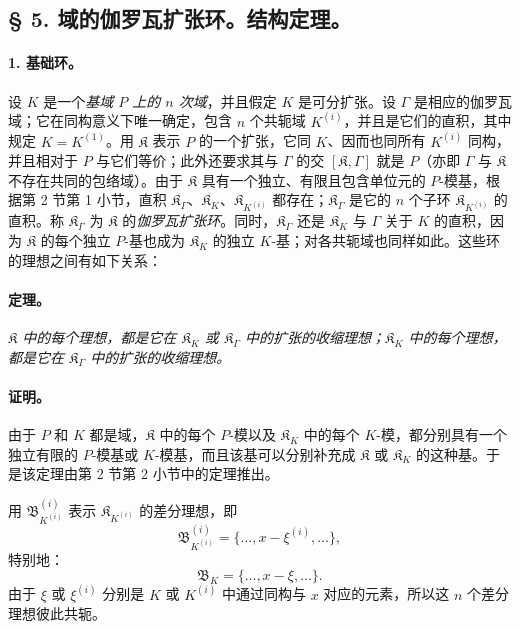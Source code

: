 \subsection*{\S{} 5. 域的伽罗瓦扩张环。结构定理。}

\paragraph{1. 基础环。}
设 $K$ 是一个\emph{基域 $P$ 上的 $n$ 次域}，并且假定 $K$ 是可分扩张。设 $\Gamma$ 是相应的伽罗瓦域；它在同构意义下唯一确定，包含 $n$ 个共轭域 $K^{(i)}$，并且是它们的直积，其中规定 $K=K^{(1)}$。用 $\mathfrak K$ 表示 $P$ 的一个扩张，它同 $K$、因而也同所有 $K^{(i)}$ 同构，并且相对于 $P$ 与它们等价；此外还要求其与 $\Gamma$ 的交 $[\mathfrak K,\Gamma]$ 就是 $P$（亦即 $\Gamma$ 与 $\mathfrak K$ 不存在共同的包络域）。由于 $\mathfrak K$ 具有一个独立、有限且包含单位元的 $P$-模基，根据第 2 节第 1 小节，直积 $\mathfrak K_\Gamma$、$\mathfrak K_K$、$\mathfrak K_{K^{(i)}}$ 都存在；$\mathfrak K_\Gamma$ 是它的 $n$ 个子环 $\mathfrak K_{K^{(i)}}$ 的直积。称 $\mathfrak K_\Gamma$ 为 $\mathfrak K$ 的\emph{伽罗瓦扩张环}。同时，$\mathfrak K_\Gamma$ 还是 $\mathfrak K_K$ 与 $\Gamma$ 关于 $K$ 的直积，因为 $\mathfrak K$ 的每个独立 $P$-基也成为 $\mathfrak K_K$ 的独立 $K$-基；对各共轭域也同样如此。这些环的理想之间有如下关系：

\paragraph{定理。}
\emph{$\mathfrak K$ 中的每个理想，都是它在 $\mathfrak K_K$ 或 $\mathfrak K_\Gamma$ 中的扩张的收缩理想；$\mathfrak K_K$ 中的每个理想，都是它在 $\mathfrak K_\Gamma$ 中的扩张的收缩理想。}

\paragraph{证明。}
由于 $P$ 和 $K$ 都是域，$\mathfrak K$ 中的每个 $P$-模以及 $\mathfrak K_K$ 中的每个 $K$-模，都分别具有一个独立有限的 $P$-模基或 $K$-模基，而且该基可以分别补充成 $\mathfrak K$ 或 $\mathfrak K_K$ 的这种基。于是该定理由第 2 节第 2 小节中的定理推出。

用 $\mathfrak B_{K^{(i)}}^{(i)}$ 表示 $\mathfrak K_{K^{(i)}}$ 的差分理想，即
\[
\mathfrak B_{K^{(i)}}^{(i)}=\{\ldots,x-\xi^{(i)},\ldots\},
\]
特别地：
\[
\mathfrak B_K=\{\ldots,x-\xi,\ldots\}.
\]
由于 $\xi$ 或 $\xi^{(i)}$ 分别是 $K$ 或 $K^{(i)}$ 中通过同构与 $x$ 对应的元素，所以这 $n$ 个差分理想彼此共轭。

